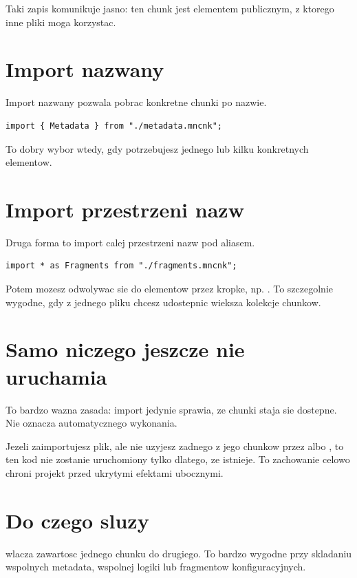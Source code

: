 Taki zapis komunikuje jasno: ten chunk jest elementem publicznym, z ktorego inne pliki
moga korzystac.

\section{Import nazwany}
Import nazwany pozwala pobrac konkretne chunki po nazwie.

\begin{lstlisting}[style=moonchunk,caption={Import nazwany}]
import { Metadata } from "./metadata.mncnk";
\end{lstlisting}

To dobry wybor wtedy, gdy potrzebujesz jednego lub kilku konkretnych elementow.

\section{Import przestrzeni nazw}
Druga forma to import calej przestrzeni nazw pod aliasem.

\begin{lstlisting}[style=moonchunk,caption={Import przestrzeni nazw}]
import * as Fragments from "./fragments.mncnk";
\end{lstlisting}

Potem mozesz odwolywac sie do elementow przez kropke, np. .
To szczegolnie wygodne, gdy z jednego pliku chcesz udostepnic wieksza kolekcje chunkow.

\section{Samo  niczego jeszcze nie uruchamia}
To bardzo wazna zasada: import jedynie sprawia, ze chunki staja sie dostepne. Nie oznacza
automatycznego wykonania.

Jezeli zaimportujesz plik, ale nie uzyjesz zadnego z jego chunkow przez 
albo , to ten kod nie zostanie uruchomiony tylko dlatego, ze istnieje.
To zachowanie celowo chroni projekt przed ukrytymi efektami ubocznymi.

\section{Do czego sluzy }
 wlacza zawartosc jednego chunku do drugiego. To bardzo wygodne przy
skladaniu wspolnych metadata, wspolnej logiki lub fragmentow konfiguracyjnych.

